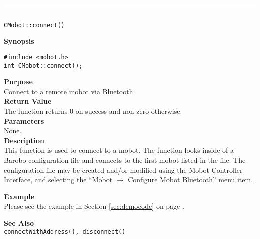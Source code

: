 \noindent
\vspace{5pt}
\rule{4.5in}{0.015in}\\
\noindent
{\LARGE \texttt{CMobot::connect()}}\\
{}

\noindent
{\bf Synopsis}
\vspace{-8pt}
\begin{verbatim}
#include <mobot.h>
int CMobot::connect();
\end{verbatim}

\noindent
{\bf Purpose}\\
Connect to a remote mobot via Bluetooth.\\

\noindent
{\bf Return Value}\\
The function returns 0 on success and non-zero otherwise.\\

\noindent
{\bf Parameters}\\
None.\\

\noindent
{\bf Description}\\
This function is used to connect to a mobot. The function looks inside of a 
Barobo configuration file and connects to the first mobot listed in the file.
The configuration file may be created and/or modified using the Mobot Controller
Interface, and selecting the ``Mobot $\rightarrow$ Configure Mobot Bluetooth'' menu item.

\noindent
{\bf Example}\\
Please see the example in Section \ref{sec:democode} on page \pageref{sec:democode}.\\
\noindent

\noindent
{\bf See Also}\\
\texttt{connectWithAddress(), disconnect()}\\

